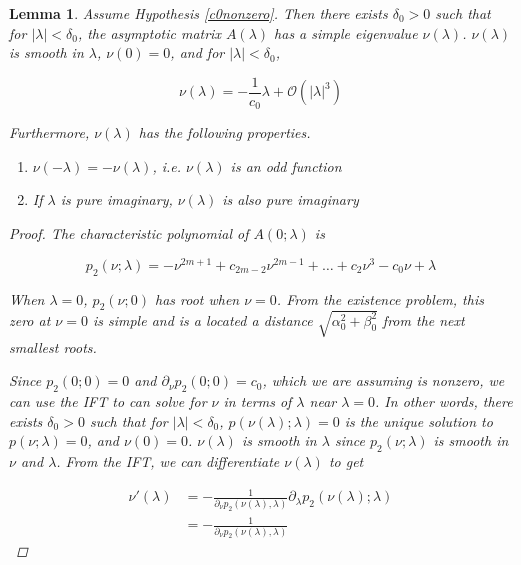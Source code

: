 \documentclass[12pt]{article}
\newtheorem{lemma}{Lemma}
\begin{document}
\begin{lemma}\label{nulambdalemma}
Assume Hypothesis \ref{c0nonzero}. Then there exists $\delta_0 > 0$ such that for $|\lambda| < \delta_0$, the asymptotic matrix $A(\lambda)$ has a simple eigenvalue $\nu(\lambda)$. $\nu(\lambda)$ is smooth in $\lambda$, $\nu(0) = 0$, and for $|\lambda| < \delta_0$,

\begin{equation}\label{nulambda}
\nu(\lambda) = -\frac{1}{c_0} \lambda + \mathcal{O}(|\lambda|^3)
\end{equation}

Furthermore, $\nu(\lambda)$ has the following properties.

\begin{enumerate}
\item $\nu(-\lambda) = -\nu(\lambda)$, i.e. $\nu(\lambda)$ is an odd function 
\item If $\lambda$ is pure imaginary, $\nu(\lambda)$ is also pure imaginary
\end{enumerate}

\begin{proof}
The characteristic polynomial of $A(0; \lambda)$ is

\begin{equation}\label{charpolyA0lambda}
p_2(\nu; \lambda) = -\nu^{2m+1} + c_{2m-2} \nu^{2m-1} + \dots + c_2 \nu^3 - c_0 \nu + \lambda
\end{equation}

When $\lambda = 0$, $p_2(\nu; 0)$ has root when $\nu = 0$. From the existence problem, this zero at $\nu = 0$ is simple and is a located a distance $\sqrt{\alpha_0^2 + \beta_0^2}$ from the next smallest roots. 

Since $p_2(0; 0) = 0$ and $\partial_\nu p_2(0; 0) = c_0$, which we are assuming is nonzero, we can use the IFT to can solve for $\nu$ in terms of $\lambda$ near $\lambda = 0$. In other words, there exists $\delta_0 > 0$ such that for $|\lambda| < \delta_0$, $p(\nu(\lambda); \lambda) = 0$ is the unique solution to $p(\nu; \lambda) = 0$, and $\nu(0) = 0$. $\nu(\lambda)$ is smooth in $\lambda$ since $p_2(\nu; \lambda)$ is smooth in $\nu$ and $\lambda$. From the IFT, we can differentiate $\nu(\lambda)$ to get

\begin{align*}
\nu'(\lambda) &= -\frac{1}{\partial_\nu p_2(\nu(\lambda),\lambda) } \partial_\lambda p_2 ( \nu(\lambda); \lambda ) \\
&= -\frac{1}{\partial_\nu p_2(\nu(\lambda),\lambda) } 
\end{align*}


\end{proof}
\end{lemma}
\end{document}
